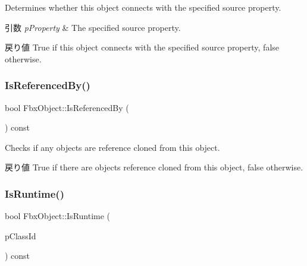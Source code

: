 Determines whether this object connects with the specified source property. 
\begin{DoxyParams}{引数}
{\em p\+Property} & The specified source property. \\
\hline
\end{DoxyParams}
\begin{DoxyReturn}{戻り値}
{\ttfamily True} if this object connects with the specified source property, {\ttfamily false} otherwise. 
\end{DoxyReturn}
\mbox{\label{class_fbx_object_af64184bd9341c8a3300588c818594328}} 
\subsubsection{\texorpdfstring{Is\+Referenced\+By()}{IsReferencedBy()}}
{\footnotesize\ttfamily bool Fbx\+Object\+::\+Is\+Referenced\+By (\begin{DoxyParamCaption}{ }\end{DoxyParamCaption}) const}

Checks if any objects are reference cloned from this object. \begin{DoxyReturn}{戻り値}
{\ttfamily True} if there are objects reference cloned from this object, {\ttfamily false} otherwise. 
\end{DoxyReturn}
\mbox{\label{class_fbx_object_ac1f9e5981fbf87911d669e078495cb09}} 
\subsubsection{\texorpdfstring{Is\+Runtime()}{IsRuntime()}}
{\footnotesize\ttfamily bool Fbx\+Object\+::\+Is\+Runtime (\begin{DoxyParamCaption}\item[{const \hyperlink{class_fbx_class_id}{Fbx\+Class\+Id} \&}]{p\+Class\+Id }\end{DoxyParamCaption}) const}

